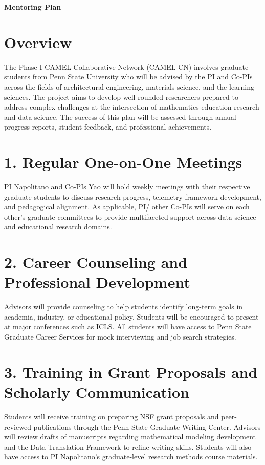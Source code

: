 \documentclass[11pt]{article}
\begin{document}
\noindent \textbf{Mentoring Plan}

\section*{Overview}
The Phase I CAMEL Collaborative Network (CAMEL-CN) involves graduate students from Penn State University who will be advised by the PI and Co-PIs across the fields of architectural engineering, materials science, and the learning sciences. The project aims to develop well-rounded researchers prepared to address complex challenges at the intersection of mathematics education research and data science. The success of this plan will be assessed through annual progress reports, student feedback, and professional achievements.

\section*{1. Regular One-on-One Meetings}
PI Napolitano and Co-PIs Yao will hold weekly meetings with their respective graduate students to discuss research progress, telemetry framework development, and pedagogical alignment. As applicable, PI/ other Co-PIs will serve on each other’s graduate committees to provide multifaceted support across data science and educational research domains.

\section*{2. Career Counseling and Professional Development}
Advisors will provide counseling to help students identify long-term goals in academia, industry, or educational policy. Students will be encouraged to present at major conferences such as ICLS. All students will have access to Penn State Graduate Career Services for mock interviewing and job search strategies.

\section*{3. Training in Grant Proposals and Scholarly Communication}
Students will receive training on preparing NSF grant proposals and peer-reviewed publications through the Penn State Graduate Writing Center. Advisors will review drafts of manuscripts regarding mathematical modeling development and the Data Translation Framework to refine writing skills. Students will also have access to PI Napolitano’s graduate-level research methods course materials.
\end{document}
